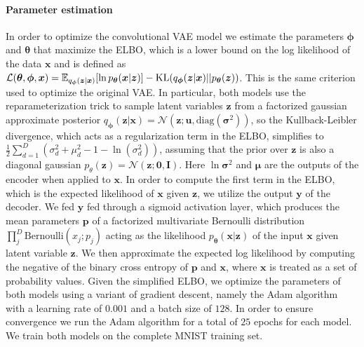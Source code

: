 \paragraph{Parameter estimation}
In order to optimize the convolutional VAE model we estimate the parameters $\bm{\phi}$ and $\bm{\theta}$ that maximize the ELBO, which is a lower bound on the log likelihood of the data $\bm{x}$ and is defined as $\mathcal{L}(\bm{\theta}, \bm{\phi}, \bm{x}) = \E_{q_{\bm{\phi}}(\bm{z}|\bm{x})}{[\ln{p_{\bm{\theta}}(\bm{x} |\bm{z} )}]} - \KL (q_{\bm{\phi}}(\bm{z}|\bm{x}) || p_{\bm{\theta}}(\bm{z}) )$. This is the same criterion used to optimize the original VAE\@. In particular, both models use the reparameterization trick to sample latent variables $\bm{z}$ from a factorized gaussian approximate posterior $q_{\bm{\phi}}(\bm{z}|\bm{x}) = \mathcal{N}(\bm{z}; \bm{u}, \text{diag}(\bm{\sigma}^2))$, so the Kullback-Leibler divergence, which acts as a regularization term in the ELBO, simplifies to $\frac{1}{2}\sum_{d=1}^{D}(\sigma_d^2 + \mu_d^2 - 1 - \ln(\sigma_d^2))$, assuming that the prior over $\bm{z}$ is also a diagonal gaussian $p_{\theta}(\bm{z}) = \mathcal{N}(\bm{z};\bm{0}, \bm{I})$. Here $\ln{\bm{\sigma}^2}$ and $\bm{\mu}$ are the outputs of the encoder when applied to $\bm{x}$. In order to compute the first term in the ELBO, which is the expected likelihood of $\bm{x}$ given $\bm{z}$, we utilize the output $\bm{y}$ of the decoder. We fed $\bm{y}$ fed through a sigmoid activation layer, which produces the mean parameters $\bm{p}$ of a factorized multivariate Bernoulli distribution $\prod_j^{D} \text{Bernoulli}(x_j; p_j)$ acting as the likelihood $p_{\bm{\theta}}(\bm{x} |\bm{z} )$ of the input $\bm{x}$ given latent variable $\bm{z}$. \iffalse As such, one may regard both VAE models as making the simplifying assumption that the MNIST data is binary, which is not technically the case. The simplifying assumption is most likely warranted given that the vast majority of pixels in the MNIST dataset are in fact either $0$ or $1$. Given this simplification , \fi We then approximate  the expected log likelihood by computing the negative of the binary cross entropy of $\bm{p}$ and $\bm{x}$, where $\bm{x}$ is treated as a set of probability values. Given the simplified ELBO, we optimize the parameters of both models using a variant of gradient descent, namely the Adam algorithm with a learning rate of $0.001$ and a batch size of $128$. In order to ensure convergence we run the Adam algorithm for a total of $25$ epochs for each model. We train both models on the complete MNIST training set.

